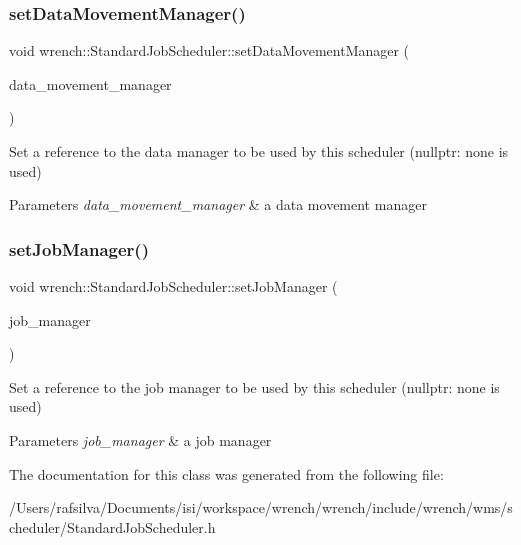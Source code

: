 \subsubsection{\texorpdfstring{set\+Data\+Movement\+Manager()}{setDataMovementManager()}}
{\footnotesize\ttfamily void wrench\+::\+Standard\+Job\+Scheduler\+::set\+Data\+Movement\+Manager (\begin{DoxyParamCaption}\item[{\hyperlink{classwrench_1_1_data_movement_manager}{Data\+Movement\+Manager} $\ast$}]{data\+\_\+movement\+\_\+manager }\end{DoxyParamCaption})\hspace{0.3cm}{\ttfamily [inline]}}



Set a reference to the data manager to be used by this scheduler (nullptr\+: none is used) 


\begin{DoxyParams}{Parameters}
{\em data\+\_\+movement\+\_\+manager} & a data movement manager \\
\hline
\end{DoxyParams}
\mbox{\label{classwrench_1_1_standard_job_scheduler_ae294e9bdc4d5e91802aad9b82c14672a}} 
\subsubsection{\texorpdfstring{set\+Job\+Manager()}{setJobManager()}}
{\footnotesize\ttfamily void wrench\+::\+Standard\+Job\+Scheduler\+::set\+Job\+Manager (\begin{DoxyParamCaption}\item[{\hyperlink{classwrench_1_1_job_manager}{Job\+Manager} $\ast$}]{job\+\_\+manager }\end{DoxyParamCaption})\hspace{0.3cm}{\ttfamily [inline]}}



Set a reference to the job manager to be used by this scheduler (nullptr\+: none is used) 


\begin{DoxyParams}{Parameters}
{\em job\+\_\+manager} & a job manager \\
\hline
\end{DoxyParams}


The documentation for this class was generated from the following file\+:\begin{DoxyCompactItemize}
\item 
/\+Users/rafsilva/\+Documents/isi/workspace/wrench/wrench/include/wrench/wms/scheduler/Standard\+Job\+Scheduler.\+h\end{DoxyCompactItemize}
